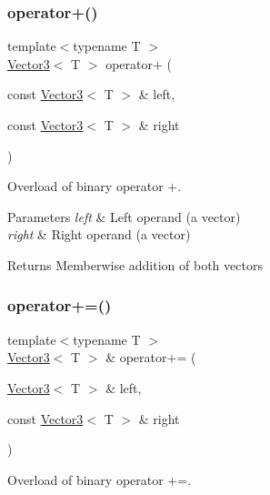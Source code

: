 \subsubsection{\texorpdfstring{operator+()}{operator+()}}
{\footnotesize\ttfamily template$<$typename T $>$ \\
\hyperlink{classsf_1_1_vector3}{Vector3}$<$ T $>$ operator+ (\begin{DoxyParamCaption}\item[{const \hyperlink{classsf_1_1_vector3}{Vector3}$<$ T $>$ \&}]{left,  }\item[{const \hyperlink{classsf_1_1_vector3}{Vector3}$<$ T $>$ \&}]{right }\end{DoxyParamCaption})\hspace{0.3cm}{\ttfamily [related]}}



Overload of binary operator +. 


\begin{DoxyParams}{Parameters}
{\em left} & Left operand (a vector) \\
\hline
{\em right} & Right operand (a vector)\\
\hline
\end{DoxyParams}
\begin{DoxyReturn}{Returns}
Memberwise addition of both vectors 
\end{DoxyReturn}
\mbox{\label{classsf_1_1_vector3_abc28859af163c63318ea2723b81c5ad9}} 
\subsubsection{\texorpdfstring{operator+=()}{operator+=()}}
{\footnotesize\ttfamily template$<$typename T $>$ \\
\hyperlink{classsf_1_1_vector3}{Vector3}$<$ T $>$ \& operator+= (\begin{DoxyParamCaption}\item[{\hyperlink{classsf_1_1_vector3}{Vector3}$<$ T $>$ \&}]{left,  }\item[{const \hyperlink{classsf_1_1_vector3}{Vector3}$<$ T $>$ \&}]{right }\end{DoxyParamCaption})\hspace{0.3cm}{\ttfamily [related]}}



Overload of binary operator +=. 

